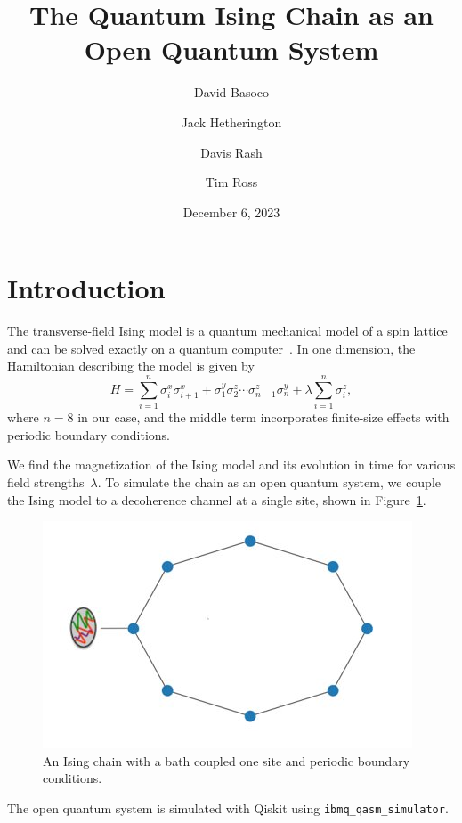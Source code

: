 \documentclass[12pt, twocolumn]{article}
\title{The Quantum Ising Chain as an Open Quantum System}
\author{David Basoco \and Jack Hetherington \and Davis Rash \and Tim Ross}
\date{December 6, 2023}
\begin{document}
  \maketitle

  \section{Introduction}
  The transverse-field Ising model is a quantum mechanical model of a spin lattice and can be solved exactly on a quantum computer~\cite{CerveraLierta18}. In one dimension, the Hamiltonian describing the model is given by
  \begin{equation}
    \label{eq:system-hamiltonian}
    H = \sum_{i = 1}^{n} \sigma_{i}^{x} \sigma_{i + 1}^{x}
        + \sigma_{1}^{y} \sigma_{2}^{z} \dotsm \sigma_{n - 1}^{z} \sigma_{n}^{y}
        + \lambda \sum_{i = 1}^{n} \sigma_{i}^{z},
  \end{equation}
  where \( n = 8 \) in our case, and the middle term incorporates finite-size effects with periodic boundary conditions.

  We find the magnetization of the Ising model and its evolution in time for various field strengths~\( \lambda \). To simulate the chain as an open quantum system, we couple the Ising model to a decoherence channel at a single site, shown in Figure~\ref{fig:ising-chain-with-environment}.
  \begin{figure}
    \centering
    \includegraphics[width=\linewidth]{images/ising_chain_with_environment.png}
    \caption{An Ising chain with a bath coupled one site and periodic boundary conditions.%
      \label{fig:ising-chain-with-environment}}
  \end{figure}
  The open quantum system is simulated with Qiskit using \texttt{ibmq\_qasm\_simulator}.
\end{document}
